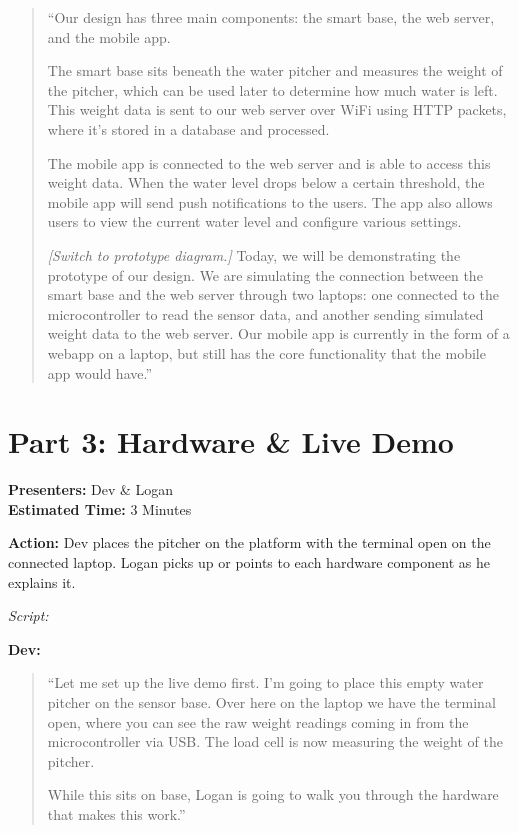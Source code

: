 \documentclass[12pt]{article}
\begin{document}
\begin{quote}
``Our design has three main components: the smart base, the web server, and the mobile app.

The smart base sits beneath the water pitcher and measures the weight of the pitcher, which can be used later to determine how much water is left. This weight data is sent to our web server over WiFi using HTTP packets, where it's stored in a database and processed. 

The mobile app is connected to the web server and is able to access this weight data. When the water level drops below a certain threshold, the mobile app will send push notifications to the users. The app also allows users to view the current water level and configure various settings.

\textit{[Switch to prototype diagram.]}
Today, we will be demonstrating the prototype of our design. We are simulating the connection between the smart base and the web server through two laptops: one connected to the microcontroller to read the sensor data, and another sending simulated weight data to the web server. Our mobile app is currently in the form of a webapp on a laptop, but still has the core functionality that the mobile app would have.'' 

\end{quote}


\section*{Part 3: Hardware \& Live Demo}
\noindent\textbf{Presenters:} Dev \& Logan\\  
\noindent\textbf{Estimated Time:} 3 Minutes

\noindent\textbf{Action:} Dev places the pitcher on the platform with the terminal open on the connected laptop. Logan picks up or points to each hardware component as he explains it.

\bigskip
\noindent\textit{Script:}

\medskip
\noindent\textbf{Dev:}
\begin{quote}
``Let me set up the live demo first. I'm going to place this empty water pitcher on the sensor base. Over here on the laptop we have the terminal open, where you can see the raw weight readings coming in from the microcontroller via USB. The load cell is now measuring the weight of the pitcher.

While this sits on base, Logan is going to walk you through the hardware that makes this work.''
\end{quote}
\end{document}
